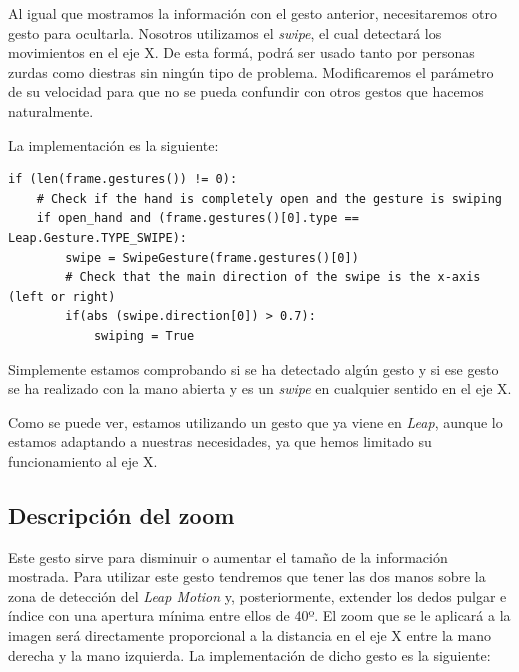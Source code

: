\documentclass[11pt,a4paper]{article}
\begin{document}
Al igual que mostramos la información con el gesto anterior, necesitaremos otro gesto para ocultarla. Nosotros utilizamos el \textit{swipe}, el cual
detectará los movimientos en el eje X. De esta formá, podrá ser usado tanto por personas zurdas como diestras sin ningún tipo de problema.
Modificaremos el parámetro de su velocidad para que no se pueda confundir con otros gestos que hacemos naturalmente.

La implementación es la siguiente:

\begin{lstlisting}
if (len(frame.gestures()) != 0):
	# Check if the hand is completely open and the gesture is swiping
	if open_hand and (frame.gestures()[0].type == Leap.Gesture.TYPE_SWIPE):
		swipe = SwipeGesture(frame.gestures()[0])
		# Check that the main direction of the swipe is the x-axis (left or right)
		if(abs (swipe.direction[0]) > 0.7):
			swiping = True
\end{lstlisting}

Simplemente estamos comprobando si se ha detectado algún gesto y si ese gesto
se ha realizado con la mano abierta y es un \textit{swipe} en cualquier sentido
en el eje X.

Como se puede ver, estamos utilizando un gesto que ya viene en \textit{Leap}, aunque
lo estamos adaptando a nuestras necesidades, ya que hemos limitado su funcionamiento
al eje X.

\subsection{Descripción del zoom}

Este gesto sirve para disminuir o aumentar el tamaño de la información mostrada. Para utilizar este gesto tendremos que tener las dos manos
sobre la zona de detección del \textit{Leap Motion} y, posteriormente, extender los dedos pulgar e índice con una apertura mínima entre ellos de 40º.
El zoom que se le aplicará a la imagen será directamente proporcional a la distancia en el eje X entre la mano derecha y la mano izquierda. La
implementación de dicho gesto es la siguiente:
\end{document}
